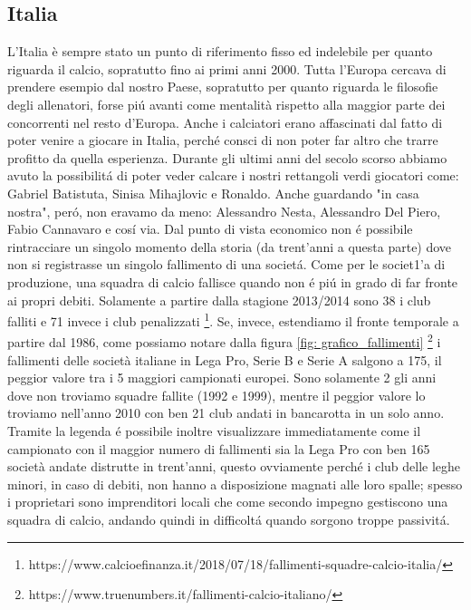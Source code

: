 \documentclass[
    corpo=11.5pt,
    oneside,
    evenboxes,
    tipotesi=triennale,
    stile=classica,
    oldstyle,
    autoretitolo,
    greek,
]{toptesi}
\begin{document}
\begin{interlinea}{1.5}
\subsection{Italia}
L'Italia è sempre stato un punto di riferimento fisso ed indelebile per quanto riguarda il calcio, sopratutto fino ai primi anni 2000.
Tutta l'Europa cercava di prendere esempio dal nostro Paese, sopratutto per quanto riguarda le filosofie degli allenatori, forse pi\'u
avanti come mentalità rispetto alla maggior parte dei concorrenti nel resto d'Europa. Anche i calciatori erano affascinati dal fatto di poter 
venire a giocare in Italia, perché consci di non poter far altro che trarre profitto da quella esperienza. Durante gli ultimi anni del
secolo scorso abbiamo avuto la possibilit\'a di poter veder calcare i nostri rettangoli verdi giocatori come: Gabriel Batistuta, Sinisa Mihajlovic e
Ronaldo. Anche guardando "in casa nostra", per\'o, non eravamo da meno: Alessandro Nesta, Alessandro Del Piero, Fabio Cannavaro e cos\'i via.
Dal punto di vista economico non \'e possibile rintracciare un singolo momento della storia (da trent'anni a questa parte) dove 
non si registrasse un singolo fallimento di una societ\'a. Come per le societ1'a di produzione, una squadra di calcio fallisce quando non
\'e pi\'u in grado di far fronte ai propri debiti. Solamente a partire dalla stagione 2013/2014 sono 38 i club falliti e 71 invece i club penalizzati \footnote{https://www.calcioefinanza.it/2018/07/18/fallimenti-squadre-calcio-italia/}. 
Se, invece, estendiamo il fronte temporale a partire dal 1986, come possiamo notare dalla figura \ref{fig: grafico_fallimenti} \footnote{https://www.truenumbers.it/fallimenti-calcio-italiano/}
i fallimenti delle società italiane in Lega Pro, Serie B e Serie A salgono a 175, il peggior valore tra i 5 maggiori campionati europei. 
Sono solamente 2 gli anni dove non troviamo squadre fallite (1992 e 1999), mentre il peggior valore lo troviamo nell'anno 2010 con ben 21 club andati in bancarotta
in un solo anno. Tramite la legenda \'e possibile inoltre visualizzare immediatamente come il campionato con il maggior numero di fallimenti sia
la Lega Pro con ben 165 società andate distrutte in trent'anni, questo ovviamente perch\'e i club delle leghe minori, in caso di debiti,
non hanno a disposizione magnati alle loro spalle; spesso i proprietari sono imprenditori locali che come secondo impegno gestiscono una
squadra di calcio, andando quindi in difficolt\'a quando sorgono troppe passivit\'a.


\end{interlinea}
\end{document}
